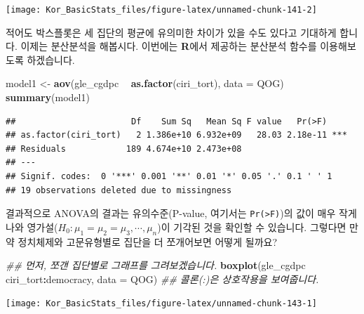 \documentclass[]{book}
\newenvironment{Shaded}{\begin{snugshade}}{\end{snugshade}}
\newcommand{\CommentTok}[1]{\textcolor[rgb]{0.56,0.35,0.01}{\textit{#1}}}
\newcommand{\DataTypeTok}[1]{\textcolor[rgb]{0.13,0.29,0.53}{#1}}
\newcommand{\KeywordTok}[1]{\textcolor[rgb]{0.13,0.29,0.53}{\textbf{#1}}}
\newcommand{\NormalTok}[1]{#1}
\newcommand{\OperatorTok}[1]{\textcolor[rgb]{0.81,0.36,0.00}{\textbf{#1}}}
\newcommand{\StringTok}[1]{\textcolor[rgb]{0.31,0.60,0.02}{#1}}
\begin{document}
\begin{center}\texttt{[image: Kor\_BasicStats\_files/figure-latex/unnamed-chunk-141-2]} \end{center}

적어도 박스플롯은 세 집단의 평균에 유의미한 차이가 있을 수도 있다고 기대하게 합니다. 이제는 분산분석을 해봅시다. 이번에는 \textbf{R}에서 제공하는 분산분석 함수를 이용해보도록 하겠습니다.

\begin{Shaded}
\begin{Highlighting}[]
\NormalTok{model1 <-}\StringTok{ }\KeywordTok{aov}\NormalTok{(gle_cgdpc }\OperatorTok{~}\StringTok{ }\KeywordTok{as.factor}\NormalTok{(ciri_tort), }\DataTypeTok{data =}\NormalTok{ QOG)}
\KeywordTok{summary}\NormalTok{(model1) }
\end{Highlighting}
\end{Shaded}

\begin{verbatim}
##                       Df    Sum Sq   Mean Sq F value   Pr(>F)    
## as.factor(ciri_tort)   2 1.386e+10 6.932e+09   28.03 2.18e-11 ***
## Residuals            189 4.674e+10 2.473e+08                     
## ---
## Signif. codes:  0 '***' 0.001 '**' 0.01 '*' 0.05 '.' 0.1 ' ' 1
## 19 observations deleted due to missingness
\end{verbatim}

결과적으로 ANOVA의 결과는 유의수준(P-value, 여기서는 \texttt{Pr(\textgreater{}F)})의 값이 매우 작게 나와 영가설(\(H_0: \mu_1 = \mu_2 = \mu_3, \cdots, \mu_n\))이 기각된 것을 확인할 수 있습니다. 그렇다면 만약 정치체제와 고문유형별로 집단을 더 쪼개어보면 어떻게 될까요?

\begin{Shaded}
\begin{Highlighting}[]
\CommentTok{## 먼저, 쪼갠 집단별로 그래프를 그려보겠습니다.}
\KeywordTok{boxplot}\NormalTok{(gle_cgdpc }\OperatorTok{~}\StringTok{ }\NormalTok{ciri_tort}\OperatorTok{:}\NormalTok{democracy, }\DataTypeTok{data =}\NormalTok{ QOG) }\CommentTok{## 콜론(:)은 상호작용을 보여줍니다.}
\end{Highlighting}
\end{Shaded}

\begin{center}\texttt{[image: Kor\_BasicStats\_files/figure-latex/unnamed-chunk-143-1]} \end{center}
\end{document}

